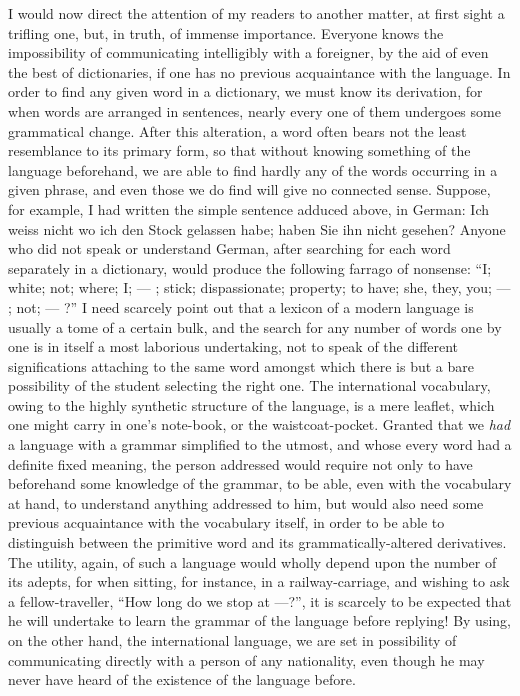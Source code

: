 \documentclass[12pt,twoside]{book}
\begin{document}
I would now direct the attention of my readers to another matter, at first sight a trifling one, but, in truth, of immense importance. Everyone knows the impossibility of communicating intelligibly with a foreigner, by the aid of even the best of dictionaries, if one has no previous acquaintance with the language. In order to find any given word in a dictionary, we must know its derivation, for when words are arranged in sentences, nearly every one of them undergoes some grammatical change. After this alteration, a word often bears not the least resemblance to its primary form, so that without knowing something of the language beforehand, we are able to find hardly any of the words occurring in a given phrase, and even those we do find will give no connected sense. Suppose, for example, I had written the simple sentence adduced above, in German: \glqq Ich weiss nicht wo ich den Stock gelassen habe; haben Sie ihn nicht gesehen?\grqq{} Anyone who did not speak or understand German, after searching for each word separately in a dictionary, would produce the following farrago of nonsense: “I; white; not; where; I; --- ; stick; dispassionate; property; to have; she, they, you; --- ; not; --- ?” I need scarcely point out that a lexicon of a modern language is usually a tome of a certain bulk, and the search for any number of words one by one is in itself a most laborious undertaking, not to speak of the different significations attaching to the same word amongst which there is but a bare possibility of the student selecting the right one. The international vocabulary, owing to the highly synthetic structure of the language, is a mere leaflet, which one might carry in one’s note-book, or the waistcoat-pocket. Granted that we \emph{had} a language with a grammar simplified to the utmost, and whose every word had a definite fixed meaning, the person addressed would require not only to have beforehand some knowledge of the grammar, to be able, even with the vocabulary at hand, to understand anything addressed to him, but would also need some previous acquaintance with the vocabulary itself, in order to be able to distinguish between the primitive word and its grammatically-altered derivatives. The utility, again, of such a language would wholly depend upon the number of its adepts, for when sitting, for instance, in a railway-carriage, and wishing to ask a fellow-traveller, “How long do we stop at ---?”, it is scarcely to be expected that he will undertake to learn the grammar of the language before replying! By using, on the other hand, the international language, we are set in possibility of communicating directly with a person of any nationality, even though he may never have heard of the existence of the language before.
\end{document}
